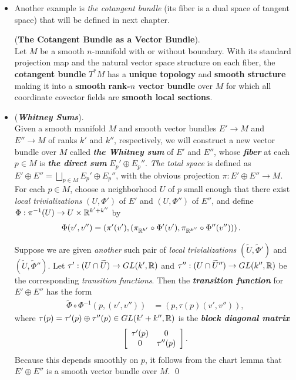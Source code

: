 \documentclass[11pt]{article}
\begin{document}
\begin{itemize}
\item Another example is \emph{the cotangent bundle} (its fiber is a dual space of tangent space) that will be defined in next chapter.
\begin{proposition} (\textbf{The Cotangent Bundle as a Vector Bundle}).\\
Let $M$ be a smooth $n$-manifold with or without boundary. With its standard projection map and the natural vector space structure on each fiber, the \textbf{cotangent bundle} $T^{*}M$ has a \textbf{unique topology} and \textbf{smooth structure} making it into a \textbf{smooth} \textbf{rank-$n$ vector bundle} over $M$ for which all coordinate covector fields are \textbf{smooth local sections}.
\end{proposition}

\item \begin{example}  (\emph{\textbf{Whitney Sums}}). \\
Given a smooth manifold $M$ and smooth vector bundles $E' \rightarrow M$ and $E'' \rightarrow M$ of ranks $k'$ and $k''$, respectively, we will construct a new vector bundle over $M$ called \emph{\textbf{the Whitney sum}} of $E'$ and $E''$, whose \emph{\textbf{fiber}} at each $p \in M$ is \emph{\textbf{the direct sum}} $E_p' \oplus E_p''$. \emph{The total space} is defined as $E' \oplus E'' = \bigsqcup_{p \in M}E_p' \oplus E_p''$, with the obvious projection $\pi: E' \oplus E'' \rightarrow M$.  For each $p \in M$,  choose a neighborhood $U$ of $p$ small enough that there exist \emph{local trivializations} $(U, \Phi')$ of $E'$ and $(U, \Phi'')$ of $E''$, and define $\Phi: \pi^{-1}(U)  \rightarrow  U \times  {\mathbb R}^{k' + k''}$ by
\begin{align*}
\Phi(v', v'') &= \left(\pi'(v'), \left(\pi_{{\mathbb R}^{k'}}\circ\Phi'(v'),  \pi_{{\mathbb R}^{k''}}\circ\Phi''(v'')\right)\right).
\end{align*}

Suppose we are given \emph{another} such pair of \emph{local trivializations} $(\widetilde{U}, \widetilde{\Phi}')$ and $(\widetilde{U}, \widetilde{\Phi}'')$. Let $\tau': (U \cap \widetilde{U}) \rightarrow GL(k', {\mathbb R})$ and $\tau'': (U \cap \widetilde{U}'') \rightarrow GL(k'',{\mathbb R})$ be the corresponding \emph{transition functions}. Then the \emph{\textbf{transition function}} for $E' \oplus E''$ has the form
\begin{align*}
\widetilde{\Phi} \circ \Phi^{-1}(p, (v', v'')) &= (p, \tau(p)(v', v'')),
\end{align*}
where $\tau(p) = \tau'(p) \oplus \tau''(p) \in GL(k'+ k'', {\mathbb R})$ is the \emph{\textbf{block diagonal matrix}}
\begin{align*}
\left[
\begin{array}{cc}
\tau'(p) & 0 \\
0 & \tau''(p)
\end{array}\right].
\end{align*} Because this depends smoothly on $p$, it follows from the chart lemma that $E' \oplus E''$ is a smooth vector bundle over $M$. \qed
\end{example}



\end{itemize}
\end{document}
